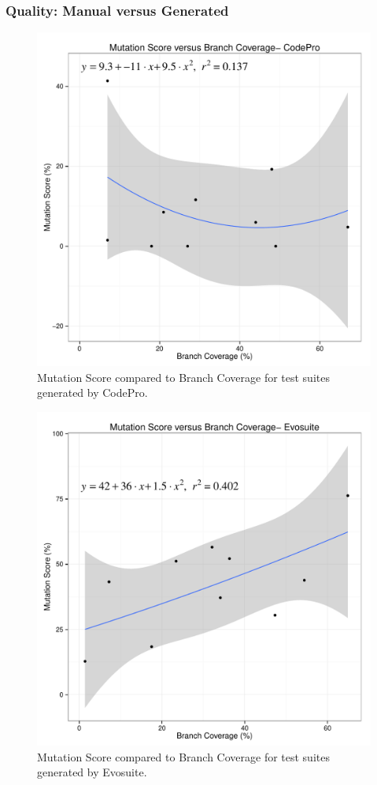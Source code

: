 \subsubsection{Quality: Manual versus Generated}

\begin{figure}[!t]
\centering
  \includegraphics[width=\linewidth]{RGraphs/CodePro_BranchCov_versus_Mutation_poly.pdf}
    \caption{Mutation Score compared to Branch Coverage for test suites generated by CodePro.}
  \label{fig:CP_branch_mutation}
\end{figure}
\begin{figure}[!t]
\centering
  \includegraphics[width=\linewidth]{RGraphs/Evosuite_BranchCov_versus_Mutation_poly.pdf}
    \caption{Mutation Score compared to Branch Coverage for test suites generated by Evosuite.}
  \label{fig:Evo_branch_mutation}
\end{figure}
